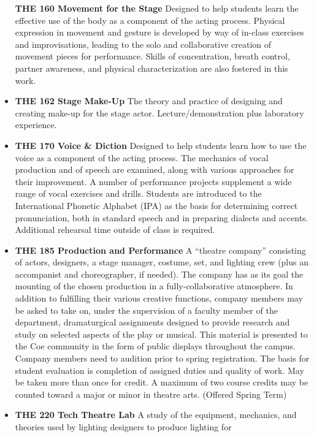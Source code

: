 \documentclass[
  letterpaper,
]{scrbook}
\begin{document}
\begin{itemize}
  \textbf{THE 160 Movement for the Stage} Designed to help students
  learn the effective use of the body as a component of the acting
  process. Physical expression in movement and gesture is developed by
  way of in-class exercises and improvisations, leading to the solo and
  collaborative creation of movement pieces for performance. Skills of
  concentration, breath control, partner awareness, and physical
  characterization are also fostered in this work.\\
\item
  \textbf{THE 162 Stage Make-Up} The theory and practice of designing
  and creating make-up for the stage actor. Lecture/demonstration plus
  laboratory experience.
\item
  \textbf{THE 170 Voice \& Diction} Designed to help students learn how
  to use the voice as a component of the acting process. The mechanics
  of vocal production and of speech are examined, along with various
  approaches for their improvement. A number of performance projects
  supplement a wide range of vocal exercises and drills. Students are
  introduced to the International Phonetic Alphabet (IPA) as the basis
  for determining correct pronunciation, both in standard speech and in
  preparing dialects and accents. Additional rehearsal time outside of
  class is required.\\
\item
  \textbf{THE 185 Production and Performance} A ``theatre company''
  consisting of actors, designers, a stage manager, costume, set, and
  lighting crew (plus an accompanist and choreographer, if needed). The
  company has as its goal the mounting of the chosen production in a
  fully-collaborative atmosphere. In addition to fulfilling their
  various creative functions, company members may be asked to take on,
  under the supervision of a faculty member of the department,
  dramaturgical assignments designed to provide research and study on
  selected aspects of the play or musical. This material is presented to
  the Coe community in the form of public displays throughout the
  campus. Company members need to audition prior to spring registration.
  The basis for student evaluation is completion of assigned duties and
  quality of work. May be taken more than once for credit. A maximum of
  two course credits may be counted toward a major or minor in theatre
  arts. (Offered Spring Term)
\item
  \textbf{THE 220 Tech Theatre Lab} A study of the equipment, mechanics,
  and theories used by lighting designers to produce lighting for

\end{itemize}
\end{document}

